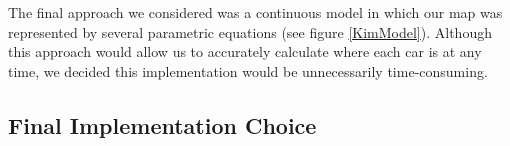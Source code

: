 \documentclass[11pt]{article}
\begin{document}
	The final approach we considered was a continuous model in which our map was represented by several parametric equations (see figure \ref{KimModel}). Although this approach would allow us to accurately calculate where each car is at any time, we decided this implementation would be unnecessarily time-consuming.  
	

\subsection{Final Implementation Choice}

	
	
	
\end{document}

